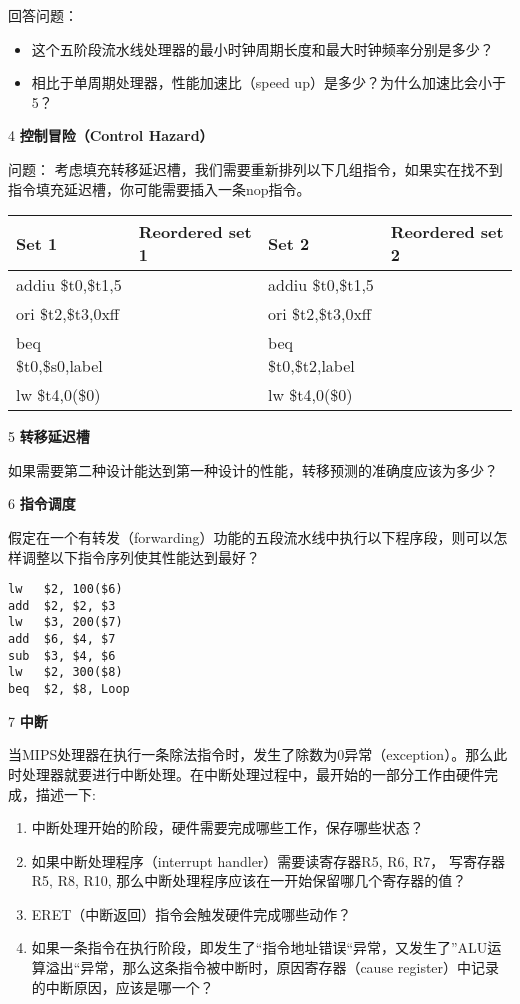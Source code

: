 \documentclass[12pt,a4paper]{article}
\newenvironment{problems}{\begin{list}{}{\renewcommand{\makelabel}[1]{\textbf{##1}.\hfil}}}{\end{list}}
\begin{document}
\begin{problems}
    回答问题：
    \begin{itemize}
        \item 这个五阶段流水线处理器的最小时钟周期长度和最大时钟频率分别是多少？
        \item 相比于单周期处理器，性能加速比（speed up）是多少？为什么加速比会小于5？
    \end{itemize}

    \item[4] \textbf{控制冒险（Control Hazard） }
    
    问题：
    考虑填充转移延迟槽，我们需要重新排列以下几组指令，如果实在找不到指令填充延迟槽，你可能需要插入一条nop指令。

    \begin{tabular}{>{\ttfamily}l>{\ttfamily}l|>{\ttfamily}l>{\ttfamily}l}
        \bfseries Set 1 &\bfseries Reordered set 1 &\bfseries Set 2 &\bfseries Reordered set 2\\
        \hline
        addiu \$t0,\$t1,5 & & addiu \$t0,\$t1,5 & \\
        ori \$t2,\$t3,0xff & & ori \$t2,\$t3,0xff & \\
        beq \$t0,\$s0,label & & beq \$t0,\$t2,label & \\
        lw \$t4,0(\$0) & & lw \$t4,0(\$0) & \\
    \end{tabular}

    \item[5] \textbf{转移延迟槽}
    
    如果需要第二种设计能达到第一种设计的性能，转移预测的准确度应该为多少？

    \item[6] \textbf{指令调度}

    假定在一个有转发（forwarding）功能的五段流水线中执行以下程序段，则可以怎样调整以下指令序列使其性能达到最好？
    \begin{verbatim}
lw   $2, 100($6)
add  $2, $2, $3
lw   $3, 200($7)
add  $6, $4, $7
sub  $3, $4, $6
lw   $2, 300($8)
beq  $2, $8, Loop
    \end{verbatim}

    \item[7] \textbf{中断}
 
当MIPS处理器在执行一条除法指令时，发生了除数为0异常（exception）。那么此时处理器就要进行中断处理。在中断处理过程中，最开始的一部分工作由硬件完成，描述一下: 
\begin{enumerate}
    \item 中断处理开始的阶段，硬件需要完成哪些工作，保存哪些状态？ 
    \item 如果中断处理程序（interrupt handler）需要读寄存器R5, R6, R7， 写寄存器R5, R8, R10, 那么中断处理程序应该在一开始保留哪几个寄存器的值？
    \item ERET（中断返回）指令会触发硬件完成哪些动作？
    \item 如果一条指令在执行阶段，即发生了“指令地址错误“异常，又发生了”ALU运算溢出“异常，那么这条指令被中断时，原因寄存器（cause register）中记录的中断原因，应该是哪一个？
\end{enumerate}
    

\end{problems}
\end{document}
